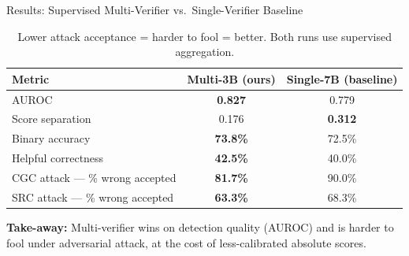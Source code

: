\documentclass[aspectratio=169]{beamer}
\begin{document}
\begin{frame}{Results: Supervised Multi-Verifier vs.\ Single-Verifier Baseline}

  \renewcommand{\arraystretch}{1.35}
  \begin{table}
    \centering
    \begin{tabular}{lcc}
      \toprule
      \textbf{Metric} & \textbf{Multi-3B (ours)} & \textbf{Single-7B (baseline)} \\
      \midrule
      AUROC                              & \textcolor{goodgreen}{\textbf{0.827}} & 0.779 \\
      Score separation                   & 0.176 & \textcolor{goodgreen}{\textbf{0.312}} \\
      Binary accuracy                    & \textcolor{goodgreen}{\textbf{73.8\%}} & 72.5\% \\
      Helpful correctness                & \textcolor{goodgreen}{\textbf{42.5\%}} & 40.0\% \\
      \midrule
      CGC attack --- \% wrong accepted   & \textcolor{goodgreen}{\textbf{81.7\%}} & \textcolor{badred}{90.0\%} \\
      SRC attack --- \% wrong accepted   & \textcolor{goodgreen}{\textbf{63.3\%}} & 68.3\% \\
      \bottomrule
    \end{tabular}
    \caption{Lower attack acceptance = harder to fool = better. Both runs use supervised aggregation.}
  \end{table}

  \vspace{0.3em}
  \small
  \textbf{Take-away:} Multi-verifier wins on detection quality (AUROC) and
  is harder to fool under adversarial attack, at the cost of less-calibrated
  absolute scores.

\end{frame}
\end{document}

